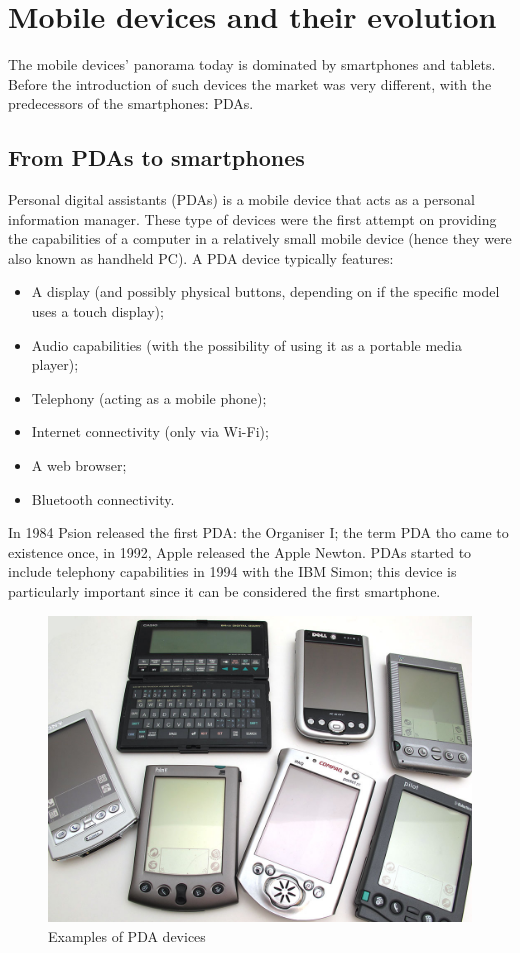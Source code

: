 \section{Mobile devices and their evolution}
The mobile devices' panorama today is dominated by smartphones and tablets. Before the introduction of such devices the market was very different, with the predecessors of the smartphones: PDAs.

\subsection{From PDAs to smartphones}
Personal digital assistants (PDAs) is a mobile device that acts as a personal information manager. These type of devices were the first attempt on providing the capabilities of a computer in a relatively small mobile device (hence they were also known as handheld PC). A PDA device typically features:
\begin{itemize}
    \item A display (and possibly physical buttons, depending on if the specific model uses a touch display);
    \item Audio capabilities (with the possibility of using it as a portable media player);
    \item Telephony (acting as a mobile phone);
    \item Internet connectivity (only via Wi-Fi);
    \item A web browser;
    \item Bluetooth connectivity.
\end{itemize}

In 1984 Psion released the first PDA: the Organiser I; the term PDA tho came to existence once, in 1992, Apple released the Apple Newton. PDAs started to include telephony capabilities in 1994 with the IBM Simon; this device is particularly important since it can be considered the first smartphone.
\vspace{5mm}

\begin{figure}[!ht]
    \centering
    \includegraphics[scale=0.35]{document/chapters/chapter_1/images/pdas.jpg}
    \caption{Examples of PDA devices \cite{is_there_still_a_market_for_pdas}}
    \label{fig:PDAs}
\end{figure}

